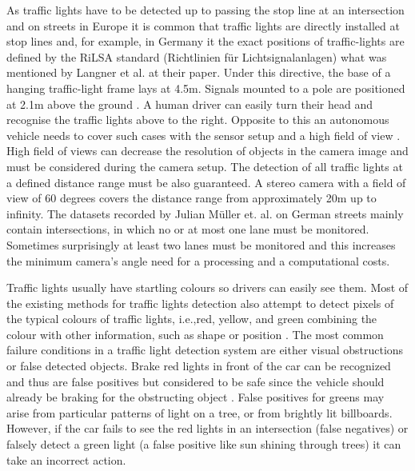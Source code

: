 \documentclass[letterpaper, 10 pt, conference]{ieeeconf} %
\begin{document}
As traffic lights have to be detected up to passing the stop line at an intersection and on streets in Europe it is common that traffic lights are directly installed at stop lines \cite{c2} and, for example, in Germany it the exact positions of traffic-lights are defined by the RiLSA standard (Richtlinien f\"ur Lichtsignalanlagen) \cite{c4} what was mentioned by Langner et al. at their paper. Under this directive, the base of a hanging traffic-light frame lays at 4.5m. Signals mounted to a pole are positioned at 2.1m above the ground \cite{c4}. A human driver can easily turn their head and recognise the traffic lights above to the right. Opposite to this an autonomous vehicle needs to cover such cases with the sensor setup and a high field of view \cite{c2}. High field of views can decrease the resolution of objects in the camera image and must be considered during the camera setup. The detection of all traffic lights at a defined distance range must be also guaranteed. A stereo camera with a field of view of 60 degrees covers the distance range from approximately 20m up to infinity. The datasets recorded by Julian M\"uller et. al. \cite{c1} \cite{c2} on German streets mainly contain intersections, in which no or at most one lane must be monitored. Sometimes surprisingly at least two lanes must be monitored and this increases the minimum camera's angle need for a processing and a computational costs.

Traffic lights usually have startling colours so drivers can easily see them. Most of the existing methods for traffic lights detection also attempt to detect pixels of the typical colours of traffic lights, i.e.,red, yellow, and green combining the colour with other information, such as shape or position \cite{c3}. The most common failure conditions in a traffic light detection system are either visual obstructions or false detected objects. Brake red lights in front of the car can be recognized and thus are false positives but considered to be safe since the vehicle should already be braking for the obstructing object \cite{c5}. False positives for greens may arise from particular patterns of light on a tree, or from brightly lit billboards\cite{c5}. However, if the car fails to see the red lights in an intersection (false negatives) or falsely detect a green light (a false positive like sun shining through trees) it can take an incorrect action. 
\end{document}
